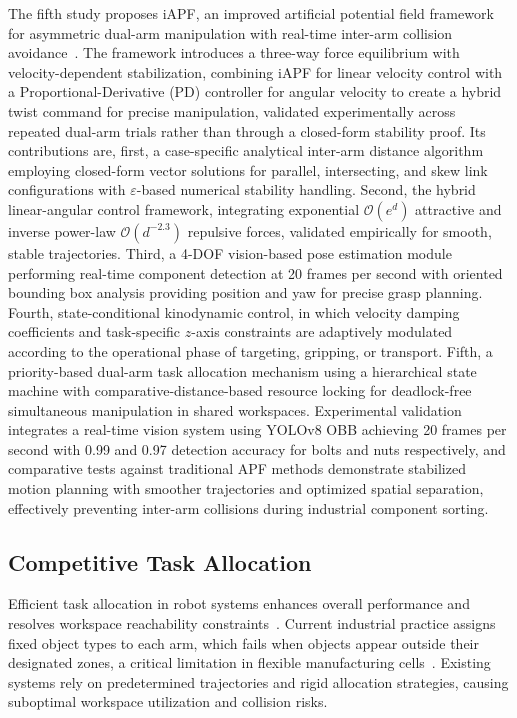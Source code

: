 The fifth study proposes iAPF, an improved artificial potential field framework for asymmetric
dual-arm manipulation with real-time inter-arm collision avoidance~\citep{surya2025iapf}. The framework
introduces a three-way force equilibrium with velocity-dependent stabilization, combining iAPF for
linear velocity control with a Proportional-Derivative (PD) controller for angular velocity to
create a hybrid twist command for precise manipulation, validated experimentally across repeated
dual-arm trials rather than through a closed-form stability proof. Its contributions are, first, a
case-specific analytical inter-arm distance algorithm employing closed-form vector solutions for
parallel, intersecting, and skew link configurations with $\varepsilon$-based numerical stability
handling. Second, the hybrid linear-angular control framework, integrating exponential
$\mathcal{O}(e^{d})$ attractive and inverse power-law $\mathcal{O}(d^{-2.3})$ repulsive forces,
validated empirically for smooth, stable trajectories. Third, a 4-DOF vision-based pose
estimation module performing real-time component detection at 20 frames per second with oriented
bounding box analysis providing position and yaw for precise grasp planning. Fourth, state-conditional
kinodynamic control, in which velocity damping coefficients and task-specific $z$-axis constraints
are adaptively modulated according to the operational phase of targeting, gripping, or transport.
Fifth, a priority-based dual-arm task allocation mechanism using a hierarchical state machine with
comparative-distance-based resource locking for deadlock-free simultaneous manipulation in shared
workspaces. Experimental validation integrates a real-time vision system using YOLOv8 OBB achieving
20 frames per second with 0.99 and 0.97 detection accuracy for bolts and nuts respectively, and
comparative tests against traditional APF methods demonstrate stabilized motion planning with
smoother trajectories and optimized spatial separation, effectively preventing inter-arm collisions
during industrial component sorting.

\subsection{Competitive Task Allocation}\label{subsec:intro_allocation}

Efficient task allocation in robot systems enhances overall performance and resolves workspace
reachability constraints~\citep{khamis2015multi,keshvarparast2024collaborative,patra2024online}.
Current industrial practice assigns fixed object types to each arm, which fails when objects appear
outside their designated zones, a critical limitation in flexible manufacturing
cells~\citep{pedersen2016robot}. Existing systems rely on predetermined trajectories and rigid
allocation strategies, causing suboptimal workspace utilization and collision risks.

